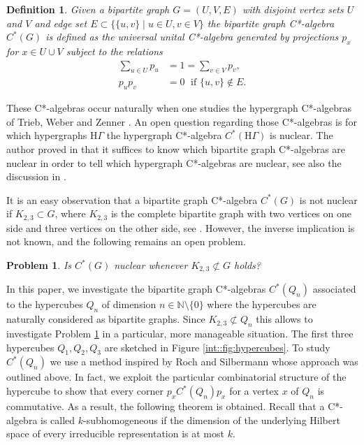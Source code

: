 \documentclass[a4paper]{amsart}
\newcommand{\N}{\mathbb{N}}
\newtheorem{definition}[thm]{Definition}
\newtheorem{problem}[thm]{Problem}
\begin{document}
\begin{definition}
  Given a bipartite graph $G = (U, V, E)$ with disjoint vertex sets $U$ and $V$ and edge set $E \subset \{\{u,v\} \mid u \in U, v \in V\}$ the \emph{bipartite graph C*-algebra} $C^\ast(G)$ is defined as the universal unital C*-algebra generated by projections $p_x$ for $x \in U \cup V$ subject to the relations
  \begin{align}
      \sum_{u \in U} p_u &= 1 = \sum_{v \in V} p_v,        \tag{GP1} \\
      p_u p_v &= 0 \; \text{ if } \{u, v\} \not \in E.     \tag{GP2}
  \end{align}
\end{definition}
These C*-algebras occur naturally when one studies the hypergraph C*-algebras of Trieb, Weber and Zenner \cite{trieb_hypergraph_2024}. An open question regarding those C*-algebras is for which hypergraphs $\mathrm{H}\Gamma$ the hypergraph C*-algebra $C^\ast(\mathrm{H}\Gamma)$ is nuclear. The author proved in \cite{schafer_nuclearity_2024} that it suffices to know which bipartite graph C*-algebras are nuclear in order to tell which hypergraph C*-algebras are nuclear, see also the discussion in \cite{schafer_classification_2025}.

It is an easy observation that a bipartite graph C*-algebra $C^\ast(G)$ is not nuclear if $K_{2,3} \subset G$, where $K_{2,3}$ is the complete bipartite graph with two vertices on one side and three vertices on the other side, see \cite[Corollary 2.9]{schafer_classification_2025}. However, the inverse implication is not known, and the following remains an open problem.

\begin{problem}
  \label{intro::problem:nuclearity_implied_by_K23_not_subgraph}
  Is $C^\ast(G)$ nuclear whenever $K_{2,3} \not \subset G$ holds?
\end{problem}

In this paper, we investigate the bipartite graph C*-algebras $C^\ast(Q_n)$ associated to the hypercubes $Q_n$ of dimension $n \in \N \setminus \{0\}$ where the hypercubes are naturally considered as bipartite graphs. Since $K_{2,3} \not \subset Q_n$ this allows to investigate Problem \ref{intro::problem:nuclearity_implied_by_K23_not_subgraph} in a particular, more manageable situation. The first three hypercubes $Q_1, Q_2, Q_3$ are sketched in Figure \ref{int::fig:hypercubes}. To study $C^\ast(Q_n)$ we use a method inspired by Roch and Silbermann \cite{roch_algebras_1988} whose approach was outlined above. In fact, we exploit the particular combinatorial structure of the hypercube to show that every corner $p_x C^\ast(Q_n) p_x$ for a vertex $x$ of $Q_n$ is commutative. As a result, the following theorem is obtained. Recall that a C*-algebra is called $k$-subhomogeneous if the dimension of the underlying Hilbert space of every irreducible representation is at most $k$.
\end{document}
